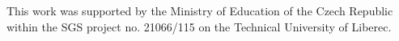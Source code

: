 \documentclass[preprint,12pt,authoryear]{elsarticle}
\begin{document}
This work was supported by the Ministry of Education of the Czech Republic within the SGS project 
no. 21066/115 on the Technical University of Liberec.





% 
% 
% 
  
 
\end{document}
